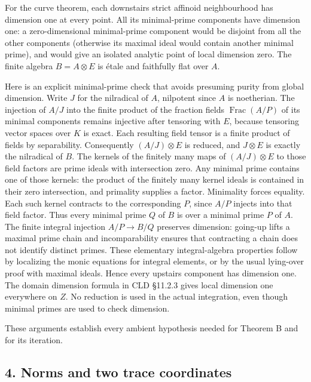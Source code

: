 \documentclass[
  11pt,
]{article}
\begin{document}
For the curve theorem, each downstairs strict affinoid neighbourhood has
dimension one at every point. All its minimal-prime components have
dimension one: a zero-dimensional minimal-prime component would be
disjoint from all the other components (otherwise its maximal ideal
would contain another minimal prime), and would give an isolated
analytic point of local dimension zero. The finite algebra
\(B=A\otimes E\) is étale and faithfully flat over \(A\).

Here is an explicit minimal-prime check that avoids presuming purity
from global dimension. Write \(J\) for the nilradical of \(A\),
nilpotent since \(A\) is noetherian. The injection of \(A/J\) into the
finite product of the fraction fields \(\operatorname{Frac}(A/P)\) of
its minimal components remains injective after tensoring with \(E\),
because tensoring vector spaces over \(K\) is exact. Each resulting
field tensor is a finite product of fields by separability. Consequently
\((A/J)\otimes E\) is reduced, and \(J\otimes E\) is exactly the
nilradical of \(B\). The kernels of the finitely many maps of
\((A/J)\otimes E\) to those field factors are prime ideals with
intersection zero. Any minimal prime contains one of those kernels: the
product of the finitely many kernel ideals is contained in their zero
intersection, and primality supplies a factor. Minimality forces
equality. Each such kernel contracts to the corresponding \(P\), since
\(A/P\) injects into that field factor. Thus every minimal prime \(Q\)
of \(B\) is over a minimal prime \(P\) of \(A\). The finite integral
injection \(A/P\to B/Q\) preserves dimension: going-up lifts a maximal
prime chain and incomparability ensures that contracting a chain does
not identify distinct primes. These elementary integral-algebra
properties follow by localizing the monic equations for integral
elements, or by the usual lying-over proof with maximal ideals. Hence
every upstairs component has dimension one. The domain dimension formula
in CLD §11.2.3 gives local dimension one everywhere on \(Z\). No
reduction is used in the actual integration, even though minimal primes
are used to check dimension.

These arguments establish every ambient hypothesis needed for Theorem B
and for its iteration.

\subsection{4. Norms and two trace
coordinates}\label{norms-and-two-trace-coordinates}
\end{document}
